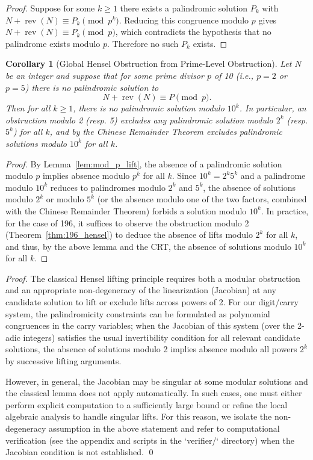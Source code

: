 \documentclass[12pt,a4paper]{article}
\newtheorem{corollary}[theorem]{Corollary}
\begin{document}
\begin{proof}
Suppose for some $k\ge1$ there exists a palindromic solution $P_k$ with
$N+\operatorname{rev}(N)\equiv P_k\pmod{p^k}$. Reducing this congruence modulo $p$ gives
$N+\operatorname{rev}(N)\equiv P_k\pmod p$, which contradicts the hypothesis that no palindrome exists modulo $p$. Therefore no such $P_k$ exists.
\end{proof}

\begin{corollary}[Global Hensel Obstruction from Prime-Level Obstruction]%
Let $N$ be an integer and suppose that for some prime divisor $p$ of 10 (i.e., $p=2$ or $p=5$) there is no palindromic solution to
\[
N + \operatorname{rev}(N) \equiv P \pmod p.
\]
Then for all $k \ge 1$, there is no palindromic solution modulo $10^k$. In particular, an obstruction modulo 2 (resp. 5) excludes any palindromic solution modulo $2^k$ (resp. $5^k$) for all $k$, and by the Chinese Remainder Theorem excludes palindromic solutions modulo $10^k$ for all $k$.
\end{corollary}

\begin{proof}
By Lemma~\ref{lem:mod_p_lift}, the absence of a palindromic solution modulo $p$ implies absence modulo $p^k$ for all $k$. Since $10^k=2^k 5^k$ and a palindrome modulo $10^k$ reduces to palindromes modulo $2^k$ and $5^k$, the absence of solutions modulo $2^k$ or modulo $5^k$ (or the absence modulo one of the two factors, combined with the Chinese Remainder Theorem) forbids a solution modulo $10^k$. In practice, for the case of 196, it suffices to observe the obstruction modulo 2 (Theorem~\ref{thm:196_hensel}) to deduce the absence of lifts modulo $2^k$ for all $k$, and thus, by the above lemma and the CRT, the absence of solutions modulo $10^k$ for all $k$.
\end{proof}

\begin{proof}
The classical Hensel lifting principle requires both a modular obstruction and an appropriate non-degeneracy of the linearization (Jacobian) at any candidate solution to lift or exclude lifts across powers of 2. For our digit/carry system, the palindromicity constraints can be formulated as polynomial congruences in the carry variables; when the Jacobian of this system (over the 2-adic integers) satisfies the usual invertibility condition for all relevant candidate solutions, the absence of solutions modulo 2 implies absence modulo all powers $2^k$ by successive lifting arguments.

However, in general, the Jacobian may be singular at some modular solutions and the classical lemma does not apply automatically. In such cases, one must either perform explicit computation to a sufficiently large bound or refine the local algebraic analysis to handle singular lifts. For this reason, we isolate the non-degeneracy assumption in the above statement and refer to computational verification (see the appendix and scripts in the `verifier/` directory) when the Jacobian condition is not established.
\qed
\end{proof}
\end{document}

